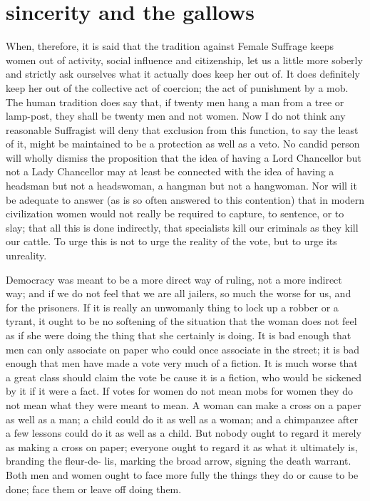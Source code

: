 \documentclass[final,10pt,letterpaper,twocolumn,openany]{book}
\begin{document}
\section{sincerity and the gallows}

     When, therefore, it is said that the tradition against Female Suffrage
keeps women out of activity, social influence and citizenship, let us a little
more soberly and strictly ask ourselves what it actually does keep her out
of. It does definitely keep her out of the collective act of coercion; the act
of punishment by a mob. The human tradition does say that, if twenty men
hang a man from a tree or lamp-post, they shall be twenty men and not
women. Now I do not think any reasonable Suffragist will deny that
exclusion from this function, to say the least of it, might be maintained to
be a protection as well as a veto. No candid person will wholly dismiss the
proposition that the idea of having a Lord Chancellor but not a Lady
Chancellor may at least be connected with the idea of having a headsman
but not a headswoman, a hangman but not a hangwoman. Nor will it be
adequate to answer (as is so often answered to this contention) that in
modern civilization women would not really be required to capture, to
sentence, or to slay; that all this is done indirectly, that specialists kill our
criminals as they kill our cattle. To urge this is not to urge the reality of the
vote, but to urge its unreality. 

Democracy was meant to be a more direct
way of ruling, not a more indirect way; and if we do not feel that we are
all jailers, so much the worse for us, and for the prisoners. If it is really an
unwomanly thing to lock up a robber or a tyrant, it ought to be no
softening of the situation that the woman does not feel as if she were doing
the thing that she certainly is doing. It is bad enough that men can only
associate on paper who could once associate in the street; it is bad enough
that men have made a vote very much of a fiction. It is much worse that a
great class should claim the vote be cause it is a fiction, who would be
sickened by it if it were a fact. If votes for women do not mean mobs for
women they do not mean what they were meant to mean. A woman can
make a cross on a paper as well as a man; a child could do it as well as a
woman; and a chimpanzee after a few lessons could do it as well as a child.
But nobody ought to regard it merely as making a cross on paper;
everyone ought to regard it as what it ultimately is, branding the fleur-de-
lis, marking the broad arrow, signing the death warrant. Both men and
women ought to face more fully the things they do or cause to be done;
face them or leave off doing them.
\end{document}
